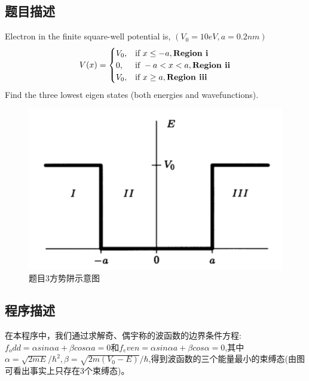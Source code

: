 \documentclass[11pt]{article}
\begin{document}
  \subsection{题目描述}
  Electron in the finite square-well potential is,  $(V_0=10eV,a=0.2 nm)$
  $$
  V(x)=\begin{cases} 
    V_0, & \text{if } x \leq -a ,\textbf{Region \uppercase\expandafter{\romannumeral 1}}\\
    0, & \text{if } -a< x < a ,\textbf{Region \uppercase\expandafter{\romannumeral 2}}\\ V_0, & \text{if } x \geq a ,\textbf{Region \uppercase\expandafter{\romannumeral 3}}\\
 \end{cases}
  $$
Find the three lowest eigen states (both energies and wavefunctions).
  \begin{figure}[ht]
    \centering
    \includegraphics[width=0.6\linewidth]{photo/fig5.png}
    \caption{题目3方势阱示意图}
    \label{fig:5}
  \end{figure}
\subsection{程序描述}
在本程序中，我们通过求解奇、偶宇称的波函数的边界条件方程:$f_odd=\alpha sin \alpha a+\beta cos \alpha a=0$和$f_even=\alpha sin\alpha a+\beta cos\alpha=0$,其中$\alpha =\sqrt{2 m E}/\hbar^2,\beta=\sqrt{2 m(V_0-E)}/\hbar$,得到波函数的三个能量最小的束缚态(由图可看出事实上只存在3个束缚态)。
\end{document}
